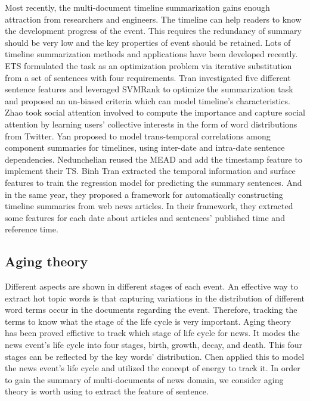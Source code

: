 \documentclass[print]{jicspack}
\begin{document}
Most recently, the multi-document timeline summarization gains enough attraction from researchers and engineers.
The timeline can help readers to know the development  progress of the event.
This requires the redundancy of summary should be very low and the key properties of event should be retained. 
Lots of timeline summarization methods and applications have been developed recently. 
ETS\cite{2011-Yan-p745-754} formulated the task as an optimization  problem via iterative substitution from a set of sentences with four requirements. 
Tran\cite{tran2013leveraging} investigated five different sentence features and leveraged SVMRank to optimize the summarization task and proposed an un-biased criteria which can model timeline's characteristics.
Zhao\cite{zhao2013timeline} took social attention involved to compute the importance and capture social attention by learning users' collective interests in the form of word distributions from Twitter.
Yan\cite{Yan-2011-TGT-2145432-2145483} proposed to model trans-temporal correlations among component summaries for timelines, using inter-date and intra-date sentence dependencies.
Nedunchelian\cite{2008-Nedunchelian-p480-485} reused the MEAD and add the timestamp feature to implement their TS.
Binh Tran\cite{binh2013structured} extracted the temporal information and surface features to train the regression model for predicting the summary sentences. 
And in the same year, they\cite{binh2013predicting} proposed a framework for automatically constructing timeline summaries from web news articles. In their framework, they extracted some features for each date about articles and sentences' published time and reference time.

\subsection{Aging theory}

Different aspects are shown in different stages of each event.
An effective way to extract hot topic words is that capturing variations  in the distribution of different word terms occur in the documents regarding the event.
Therefore, tracking the terms to know what the stage of the life cycle is very important.
Aging theory has been proved effictive to track which stage of life cycle for news. 
It modes the news event's life cycle into four stages, birth, growth, decay, and death.
This four stages can be reflected by the key words' distribution.
Chen\cite{2007-Chen-p1016-1025}\cite{chen2003life} applied this to model the news event's life cycle and utilized the concept of energy to track it. 
In order to gain the summary of multi-documents of news domain, we consider aging theory is worth using to extract the feature of sentence.
\end{document}
